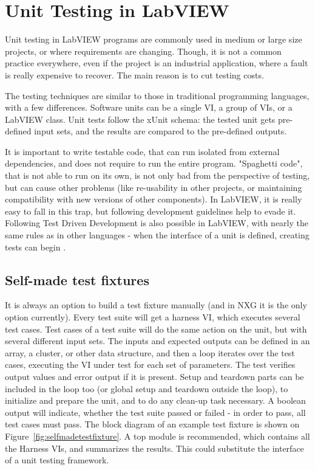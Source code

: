 \chapter{Unit Testing in LabVIEW}
\label{chap:testing}

Unit testing in LabVIEW programs are commonly used in medium or large size projects, or where requirements are changing. Though, it is not a common practice everywhere, even if the project is an industrial application, where a fault is really expensive to recover. The main reason is to cut testing costs.

The testing techniques are similar to those in traditional programming languages, with a few differences. Software units can be a single VI, a group of VIs, or a LabVIEW class. Unit tests follow the xUnit schema: the tested unit gets pre-defined input sets, and the results are compared to the pre-defined outputs.

It is important to write testable code, that can run isolated from external dependencies, and does not require to run the entire program. "Spaghetti code", that is not able to run on its own, is not only bad from the perspective of testing, but can cause other problems (like re-usability in other projects, or maintaining compatibility with new versions of other components). In LabVIEW, it is really easy to fall in this trap, but following development guidelines help to evade it. Following Test Driven Development is also possible in LabVIEW, with nearly the same rules as in other languages - when the interface of a unit is defined, creating tests can begin \cite{delacor_ni2014}. 

\section{Self-made test fixtures}
It is always an option to build a test fixture manually (and in NXG it is the only option currently). Every test suite will get a harness VI, which executes several test cases. Test cases of a test suite will do the same action on the unit, but with several different input sets. The inputs and expected outputs can be defined in an array, a cluster, or other data structure, and then a loop iterates over the test cases, executing the VI under test for each set of parameters. The test verifies output values and error output if it is present. Setup and teardown parts can be included in the loop too (or global setup and teardown outside the loop), to initialize and prepare the unit, and to do any clean-up task necessary. A boolean output will indicate, whether the test suite passed or failed - in order to pass, all test cases must pass. The block diagram of an example test fixture is shown on Figure~\ref{fig:selfmadetestfixture}.
A top module is recommended, which contains all the Harness VIs, and summarizes the results. This could substitute the interface of a unit testing framework. 

